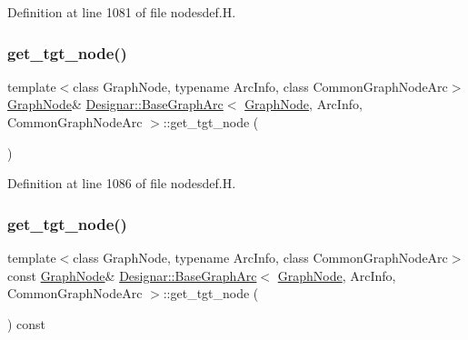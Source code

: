 Definition at line 1081 of file nodesdef.\+H.

\mbox{\label{class_designar_1_1_base_graph_arc_a2fe944d9d98fd2451d0c82fa0e805bce}} 
\subsubsection{\texorpdfstring{get\+\_\+tgt\+\_\+node()}{get\_tgt\_node()}\hspace{0.1cm}{\footnotesize\ttfamily [1/2]}}
{\footnotesize\ttfamily template$<$class Graph\+Node, typename Arc\+Info, class Common\+Graph\+Node\+Arc$>$ \\
\hyperlink{class_designar_1_1_graph_node}{Graph\+Node}\& \hyperlink{class_designar_1_1_base_graph_arc}{Designar\+::\+Base\+Graph\+Arc}$<$ \hyperlink{class_designar_1_1_graph_node}{Graph\+Node}, Arc\+Info, Common\+Graph\+Node\+Arc $>$\+::get\+\_\+tgt\+\_\+node (\begin{DoxyParamCaption}{ }\end{DoxyParamCaption})\hspace{0.3cm}{\ttfamily [inline]}}



Definition at line 1086 of file nodesdef.\+H.

\mbox{\label{class_designar_1_1_base_graph_arc_aecf3b0b06c1019563d433d44e922775b}} 
\subsubsection{\texorpdfstring{get\+\_\+tgt\+\_\+node()}{get\_tgt\_node()}\hspace{0.1cm}{\footnotesize\ttfamily [2/2]}}
{\footnotesize\ttfamily template$<$class Graph\+Node, typename Arc\+Info, class Common\+Graph\+Node\+Arc$>$ \\
const \hyperlink{class_designar_1_1_graph_node}{Graph\+Node}\& \hyperlink{class_designar_1_1_base_graph_arc}{Designar\+::\+Base\+Graph\+Arc}$<$ \hyperlink{class_designar_1_1_graph_node}{Graph\+Node}, Arc\+Info, Common\+Graph\+Node\+Arc $>$\+::get\+\_\+tgt\+\_\+node (\begin{DoxyParamCaption}{ }\end{DoxyParamCaption}) const\hspace{0.3cm}{\ttfamily [inline]}}



